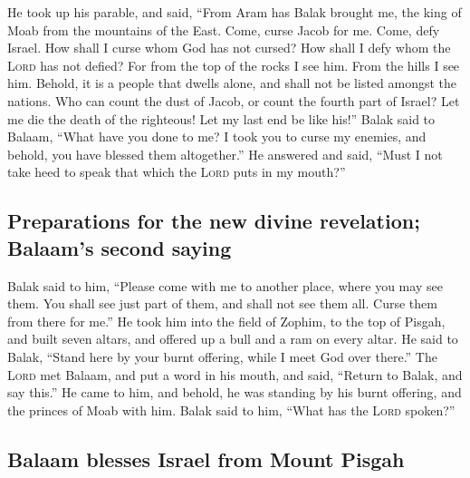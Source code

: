  He took up his parable, and said, ``From Aram has Balak
brought me, the king of Moab from the mountains of the East. Come, curse
Jacob for me. Come, defy Israel.  How shall I curse whom
God has not cursed? How shall I defy whom the \textsc{Lord} has not
defied?  For from the top of the rocks I see him. From the
hills I see him. Behold, it is a people that dwells alone, and shall not
be listed amongst the nations.  Who can count the dust of
Jacob, or count the fourth part of Israel? Let me die the death of the
righteous! Let my last end be like his!''  Balak said to
Balaam, ``What have you done to me? I took you to curse my enemies, and
behold, you have blessed them altogether.''  He answered
and said, ``Must I not take heed to speak that which the \textsc{Lord}
puts in my mouth?''

\hypertarget{preparations-for-the-new-divine-revelation-balaams-second-saying}{%
\subsection{Preparations for the new divine revelation; Balaam's second
saying}\label{preparations-for-the-new-divine-revelation-balaams-second-saying}}

 Balak said to him, ``Please come with me to another
place, where you may see them. You shall see just part of them, and
shall not see them all. Curse them from there for me.'' 
He took him into the field of Zophim, to the top of Pisgah, and built
seven altars, and offered up a bull and a ram on every altar.
 He said to Balak, ``Stand here by your burnt offering,
while I meet God over there.''  The \textsc{Lord} met
Balaam, and put a word in his mouth, and said, ``Return to Balak, and
say this.''  He came to him, and behold, he was standing
by his burnt offering, and the princes of Moab with him. Balak said to
him, ``What has the \textsc{Lord} spoken?''

\hypertarget{balaam-blesses-israel-from-mount-pisgah}{%
\subsection{Balaam blesses Israel from Mount
Pisgah}\label{balaam-blesses-israel-from-mount-pisgah}}


